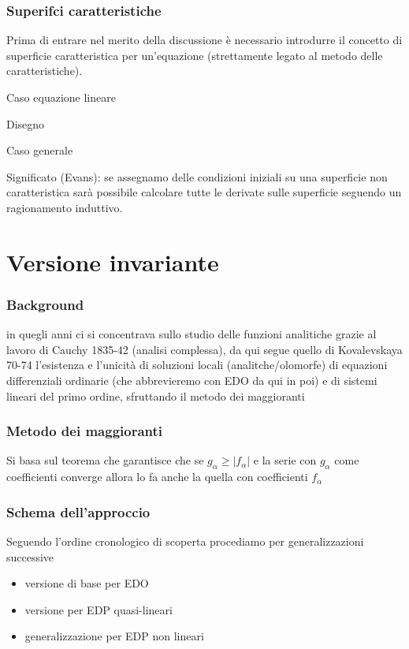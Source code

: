 \documentclass{beamer}
\begin{document}
\begin{frame}
\frametitle{Superifci caratteristiche}
Prima di entrare nel merito della discussione è necessario introdurre il concetto di superficie caratteristica per un'equazione (strettamente legato al metodo delle caratteristiche).

Caso equazione lineare

Disegno
\end{frame}

\begin{frame}
Caso generale
\end{frame}

\begin{frame}
Significato (Evans): se assegnamo delle condizioni iniziali su una superficie non caratteristica sarà possibile calcolare tutte le derivate sulle superficie seguendo un ragionamento induttivo.
\end{frame}


\section{Versione invariante}

\begin{frame}
\frametitle{Background}
in quegli anni ci si concentrava sullo studio delle funzioni analitiche grazie al lavoro di Cauchy 1835-42 (analisi complessa), da qui segue quello di Kovalevskaya 70-74
l'esistenza e l'unicità di soluzioni locali (analitche/olomorfe) di equazioni differenziali ordinarie (che abbrevieremo con EDO da qui in poi) e di sistemi lineari del primo ordine, sfruttando il metodo dei maggioranti
\end{frame}

\begin{frame}
\frametitle{Metodo dei maggioranti}
Si basa sul teorema che garantisce che se $g_\alpha \geq |f_\alpha|$ e la serie con $g_\alpha$ come coefficienti converge allora lo fa anche la quella con coefficienti $f_\alpha$
\end{frame}

\begin{frame}
\frametitle{Schema dell'approccio}
Seguendo l'ordine cronologico di scoperta procediamo per generalizzazioni successive
\begin{itemize}
\item versione di base per EDO
\item versione per EDP quasi-lineari
\item generalizzazione per EDP non lineari
\end{itemize}
\end{frame}
\end{document}
